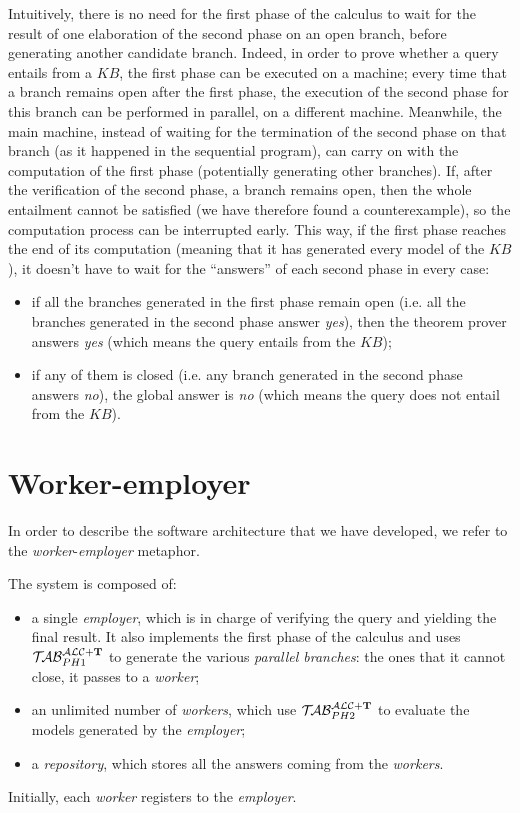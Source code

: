 \documentclass[a4paper, 11pt, oneside]{duthesis}
\newcommand{\tip}{{\bf T}}
\newcommand{\primo}{\mathrel{{\mathcal{T}\!\mathcal{AB}}}_{PH 1}^{\mathcal{ALC}+\mbox{\scriptsize $\tip$}}}
\newcommand{\secondo}{\mathrel{{\mathcal{T}\!\mathcal{AB}}}_{PH 2}^{\mathcal{ALC}+\mbox{\scriptsize $\tip$}}}
\begin{document}
Intuitively, there is no need for the first phase of the calculus to wait for the result of one elaboration of the second phase on an open branch, before generating another candidate branch.
Indeed, in order to prove whether a query entails from a $KB$, the first phase can be executed on a machine; every time that a branch remains open after the first phase, the execution of the second phase for this branch can be performed in parallel, on a different machine.
Meanwhile, the main machine, instead of waiting for the termination of the second phase on that branch (as it happened in the sequential program), can carry on with the computation of the first phase (potentially generating other branches).
If, after the verification of the second phase, a branch remains open, then the whole entailment cannot be satisfied (we have therefore found a counterexample), so the computation process can be interrupted early.
This way, if the first phase reaches the end of its computation (meaning that it has generated every model of the $KB$), it doesn't have to wait for the ``answers'' of each second phase in every case:
\begin{itemize}
\item if all the branches generated in the first phase remain open (i.e. all the branches generated in the second phase answer \emph{yes}), then the theorem prover answers \emph{yes} (which means the query entails from the $KB$);
\item if any of them is closed (i.e. any branch generated in the second phase answers \emph{no}), the global answer is \emph{no} (which means the query does not entail from the $KB$).
\end{itemize}

\section{Worker-employer}\label{workemp}

In order to describe the software architecture that we have developed, we refer to the \emph{worker}-\emph{employer} metaphor.

The system is composed of:
\begin{itemize}
\item a single \emph{employer}, which is in charge of verifying the query and yielding the final result. It also implements the first phase of the calculus and uses $\primo$ to generate the various \emph{parallel branches}: the ones that it cannot close, it passes to a \emph{worker};
\item an unlimited number of \emph{workers}, which use $\secondo$ to evaluate the models generated by the \emph{employer};
\item a \emph{repository}, which stores all the answers coming from the \emph{workers}.
\end{itemize}
Initially, each \emph{worker} registers to the \emph{employer}.
\end{document}
